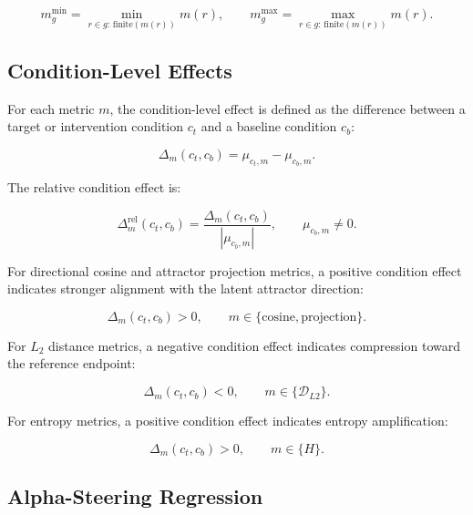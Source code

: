 \begin{equation}
m^{\min}_{g}
=
\min_{r \in g:\,\mathrm{finite}(m(r))}
m(r),
\qquad
m^{\max}_{g}
=
\max_{r \in g:\,\mathrm{finite}(m(r))}
m(r).
\end{equation}

\subsection{Condition-Level Effects}
\label{subsec:condition_effects}

For each metric $m$, the condition-level effect is defined as the difference between a target or intervention condition $c_t$ and a baseline condition $c_b$:

\begin{equation}
\Delta_m(c_t,c_b)
=
\mu_{c_t,m}
-
\mu_{c_b,m}.
\end{equation}

The relative condition effect is:

\begin{equation}
\Delta^{\mathrm{rel}}_m(c_t,c_b)
=
\frac{
\Delta_m(c_t,c_b)
}{
|\mu_{c_b,m}|
},
\qquad
\mu_{c_b,m} \neq 0.
\end{equation}

For directional cosine and attractor projection metrics, a positive condition effect indicates stronger alignment with the latent attractor direction:

\begin{equation}
\Delta_m(c_t,c_b) > 0,
\qquad
m \in
\{
\mathrm{cosine},
\mathrm{projection}
\}.
\end{equation}

For $L_2$ distance metrics, a negative condition effect indicates compression toward the reference endpoint:

\begin{equation}
\Delta_m(c_t,c_b) < 0,
\qquad
m \in
\{
\mathcal{D}_{L2}
\}.
\end{equation}

For entropy metrics, a positive condition effect indicates entropy amplification:

\begin{equation}
\Delta_m(c_t,c_b) > 0,
\qquad
m \in
\{
H
\}.
\end{equation}

\subsection{Alpha-Steering Regression}
\label{subsec:alpha_regression}

